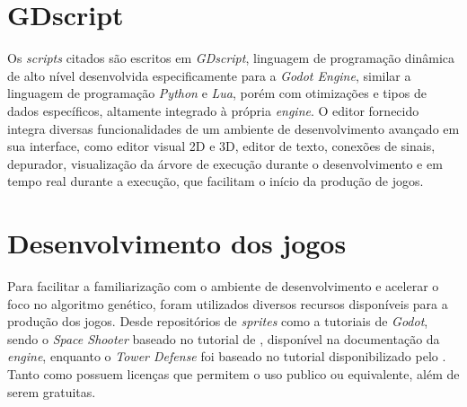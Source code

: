 \section{GDscript}
\label{sec:godot-gdscript}


Os \textit{scripts} citados são escritos em \textit{GDscript}, linguagem de programação dinâmica de alto nível desenvolvida especificamente para a \textit{Godot Engine}, similar a linguagem de programação \textit{Python} e \textit{Lua}, porém com otimizações e tipos de dados específicos, altamente integrado à própria \textit{engine}\citep{godot-faq}. O editor fornecido integra diversas funcionalidades de um ambiente de desenvolvimento avançado em sua interface, como editor visual 2D e 3D, editor de texto, conexões de sinais, depurador, visualização da árvore de execução durante o desenvolvimento e em tempo real durante a execução, que facilitam o início da produção de jogos.

\section{Desenvolvimento dos jogos}
\label{sec:desenvolvimento}


Para facilitar a familiarização com o ambiente de desenvolvimento e acelerar o foco no algoritmo genético, foram utilizados diversos recursos disponíveis para a produção dos jogos. Desde repositórios de \textit{sprites} como \citet{Kenny_sprites} a tutoriais de \textit{Godot}, sendo o \textit{Space Shooter} baseado no tutorial de \citet{Godot_Linietsy}, disponível na documentação da \textit{engine}, enquanto o \textit{Tower Defense} foi baseado no tutorial disponibilizado pelo \citet{GameDevelopmentCenter21:tdtutorial}. Tanto \citet{Kenny_sprites} como \citet{Godot_Linietsy} possuem licenças que permitem o uso publico ou equivalente, além de serem gratuitas.  
